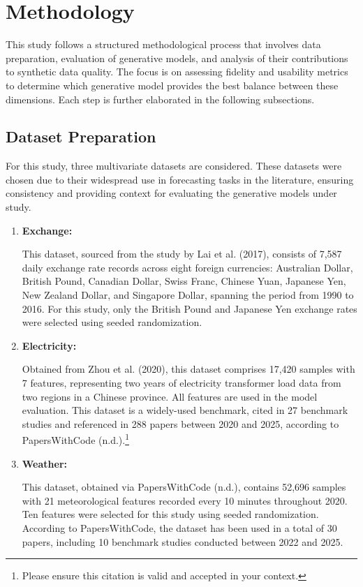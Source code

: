 \documentclass{article}
\begin{document}
\newpage
\section{Methodology}
This study follows a structured methodological process that involves data preparation, evaluation of generative models, and analysis of their contributions to synthetic data quality. The focus is on assessing fidelity and usability metrics to determine which generative model provides the best balance between these dimensions. Each step is further elaborated in the following subsections.

\subsection{Dataset Preparation}
For this study, three multivariate datasets are considered. These datasets were chosen due to their widespread use in forecasting tasks in the literature, ensuring consistency and providing context for evaluating the generative models under study.

\begin{enumerate}
    \item \textbf{Exchange:} 
    
    This dataset, sourced from the study by Lai et al. (2017), consists of 7,587 daily exchange rate records across eight foreign currencies: Australian Dollar, British Pound, Canadian Dollar, Swiss Franc, Chinese Yuan, Japanese Yen, New Zealand Dollar, and Singapore Dollar, spanning the period from 1990 to 2016. For this study, only the British Pound and Japanese Yen exchange rates were selected using seeded randomization.

    \item \textbf{Electricity:} 
    
    Obtained from Zhou et al. (2020), this dataset comprises 17,420 samples with 7 features, representing two years of electricity transformer load data from two regions in a Chinese province. All features are used in the model evaluation. This dataset is a widely-used benchmark, cited in 27 benchmark studies and referenced in 288 papers between 2020 and 2025, according to PapersWithCode (n.d.).\footnote{Please ensure this citation is valid and accepted in your context.}

    
    \item \textbf{Weather:} 

    This dataset, obtained via PapersWithCode (n.d.), contains 52,696 samples with 21 meteorological features recorded every 10 minutes throughout 2020. Ten features were selected for this study using seeded randomization. According to PapersWithCode, the dataset has been used in a total of 30 papers, including 10 benchmark studies conducted between 2022 and 2025.



\end{enumerate}
\end{document}
